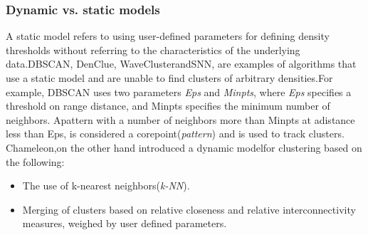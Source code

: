 \subsubsection{Dynamic vs. static models}\label{subsec:dynamic_static} 
A static model refers to using user-defined parameters for defining density thresholds without referring to the characteristics of the underlying data.DBSCAN, DenClue, WaveClusterandSNN, are examples of algorithms that use a static model and are unable to find clusters of arbitrary densities.For example, DBSCAN uses two parameters \textit{Eps} and \textit{Minpts}, where \textit{Eps} specifies a threshold on range distance,
and Minpts specifies the minimum number of neighbors.
Apattern with a number of neighbors more than Minpts at adistance less than Eps, is considered a corepoint(\textit{pattern}) and is used to track clusters. Chameleon,on the other hand introduced a dynamic modelfor
clustering based on the following:
\begin{itemize}
\item The use of k-nearest neighbors(\textit{k-NN}).
\item Merging of clusters based on relative closeness and relative interconnectivity measures, weighed by user defined parameters.
\end{itemize}


